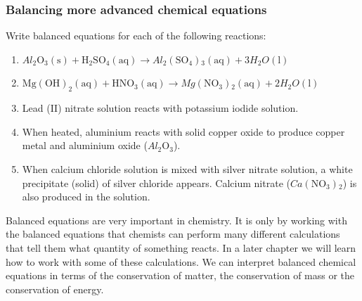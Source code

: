     \addtocounter{footnote}{-0}
    \par \label{m38727*secfhsst!!!underscore!!!id1261}
            \subsubsection{  Balancing more advanced chemical equations
      }
            \nopagebreak
            
      \label{m38727*id66790}Write balanced equations for each of the following reactions:\par 
      \label{m38727*id66796}\begin{enumerate}[noitemsep, label=\textbf{\arabic*}. ] 
            \label{m38727*uid31}\item 
\begin{math}{Al}_{2}{\mathrm{O}}_{3}\left(\mathrm{s}\right)+{\mathrm{H}}_{2}{\mathrm{SO}}_{4}\left(\mathrm{aq}\right)\to {Al}_{2}\left({\mathrm{SO}}_{4}\right){}_{3}\left(\mathrm{aq}\right)+3{{H}}_{2}{O}\left(\mathrm{l}\right)\end{math}
        \label{m38727*uid32}\item 
        \begin{math}{\mathrm{Mg\left(OH\right)}}_{2}\left(\mathrm{aq}\right)+{\mathrm{HNO}}_{3}\left(\mathrm{aq}\right)\to Mg\left({\mathrm{NO}}_{3}\right){}_{2}\left(\mathrm{aq}\right)+2{{H}}_{2}{O}\left(\mathrm{l}\right)\end{math}
        \label{m38727*uid33}\item Lead (II) nitrate solution reacts with potassium iodide solution.
\label{m38727*uid34}\item When heated, aluminium reacts with solid copper oxide to produce copper metal and aluminium oxide (\begin{math}{Al}_{2}{\mathrm{O}}_{3}\end{math}).
\label{m38727*uid35}\item When calcium chloride solution is mixed with silver nitrate solution, a white precipitate (solid) of silver chloride appears. Calcium nitrate (\begin{math}Ca\left({\mathrm{NO}}_{3}\right){}_{2}\end{math}) is also produced in the solution.
        \end{enumerate}
        
      

    
    \label{m38727*eip-429}Balanced equations are very important in chemistry. It is only by working with the balanced equations that chemists can perform many different calculations that tell them what quantity of something reacts. In a later chapter we will learn how to work with some of these calculations. We can interpret balanced chemical equations in terms of the conservation of matter, the conservation of mass or the conservation of energy. \label{m38727*eip-366}
    \setcounter{subfigure}{0}


